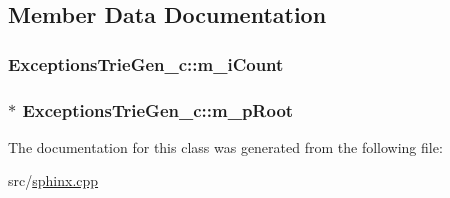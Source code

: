 \subsection{Member Data Documentation}
\hypertarget{classExceptionsTrieGen__c_aae43cdb5e11cb1655cf6e8de8e95b9b8}{
\subsubsection[{m\-\_\-i\-Count}]{ Exceptions\-Trie\-Gen\-\_\-c\-::m\-\_\-i\-Count\hspace{0.3cm}{\ttfamily [protected]}}}\label{classExceptionsTrieGen__c_aae43cdb5e11cb1655cf6e8de8e95b9b8}
\hypertarget{classExceptionsTrieGen__c_a3fc2613488897a8c241d8114f4210268}{
\subsubsection[{m\-\_\-p\-Root}]{$\ast$ Exceptions\-Trie\-Gen\-\_\-c\-::m\-\_\-p\-Root\hspace{0.3cm}{\ttfamily [protected]}}}\label{classExceptionsTrieGen__c_a3fc2613488897a8c241d8114f4210268}


The documentation for this class was generated from the following file\-:\begin{DoxyCompactItemize}
\item 
src/\hyperlink{sphinx_8cpp}{sphinx.\-cpp}\end{DoxyCompactItemize}
